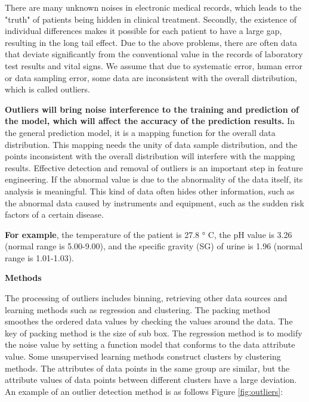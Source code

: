 There are many unknown noises in electronic medical records, which leads to the "truth" of patients being hidden in clinical treatment. Secondly, the existence of individual differences makes it possible for each patient to have a large gap, resulting in the long tail effect. Due to the above problems, there are often data that deviate significantly from the conventional value in the records of laboratory test results and vital signs. We assume that due to systematic error, human error or data sampling error, some data are inconsistent with the overall distribution, which is called outliers. 

\textbf{Outliers will bring noise interference to the training and prediction of the model, which will affect the accuracy of the prediction results.} In the general prediction model, it is a mapping function for the overall data distribution. This mapping needs the unity of data sample distribution, and the points inconsistent with the overall distribution will interfere with the mapping results. Effective detection and removal of outliers is an important step in feature engineering. If the abnormal value is due to the abnormality of the data itself, its analysis is meaningful. This kind of data often hides other information, such as the abnormal data caused by instruments and equipment, such as the sudden risk factors of a certain disease.

\textbf{For example}, the temperature of the patient is 27.8 ° C, the pH value is 3.26 (normal range is 5.00-9.00), and the specific gravity (SG) of urine is 1.96 (normal range is 1.01-1.03).

\textbf{Methods}

The processing of outliers includes binning, retrieving other data sources and learning methods such as regression and clustering. The packing method smoothes the ordered data values by checking the values around the data. The key of packing method is the size of sub box. The regression method is to modify the noise value by setting a function model that conforms to the data attribute value. Some unsupervised learning methods construct clusters by clustering methods. The attributes of data points in the same group are similar, but the attribute values of data points between different clusters have a large deviation. An example of an outlier detection method is as follows Figure \ref{fig:outliers}:

